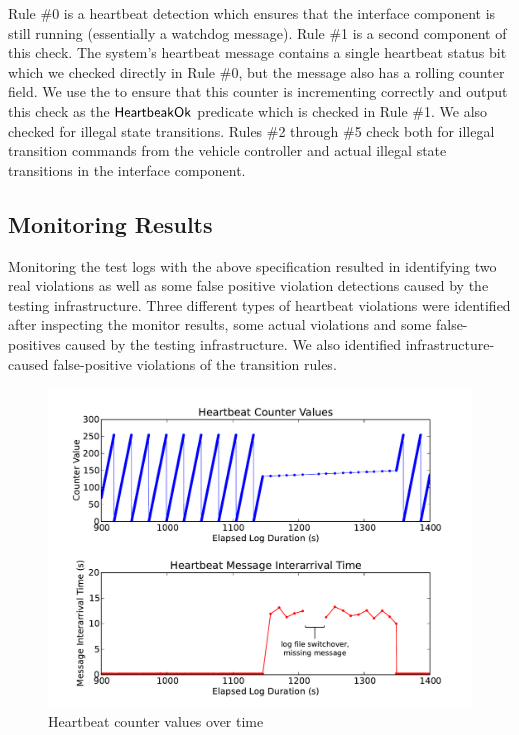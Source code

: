 Rule \#0 is a heartbeat detection which ensures that the interface component is still running (essentially a watchdog message). Rule \#1 is a second component of this check. The system's heartbeat message contains a single heartbeat status bit which we checked directly in Rule \#0, but the message also has a rolling counter field. We use the \sfmap to ensure that this counter is incrementing correctly and output this check as the $\mathsf{HeartbeakOk}$ predicate which is checked in Rule \#1.
We also checked for illegal state transitions. Rules \#2 through \#5 check both for illegal transition commands from the vehicle controller and actual illegal state transitions in the interface component.


\subsection{Monitoring Results}
Monitoring the test logs with the above specification resulted in identifying two real violations as well as some false positive violation detections caused by the testing infrastructure.
%
Three different types of heartbeat violations were identified after inspecting the monitor results, some actual violations and some false-positives caused by the testing infrastructure. We also identified infrastructure-caused false-positive violations of the transition rules.

\begin{figure}[t]
		\includegraphics[width=4.5in]{img/hb1}
		\caption{Heartbeat counter values over time}
		\label{fig:hb_arrival}
\end{figure}

